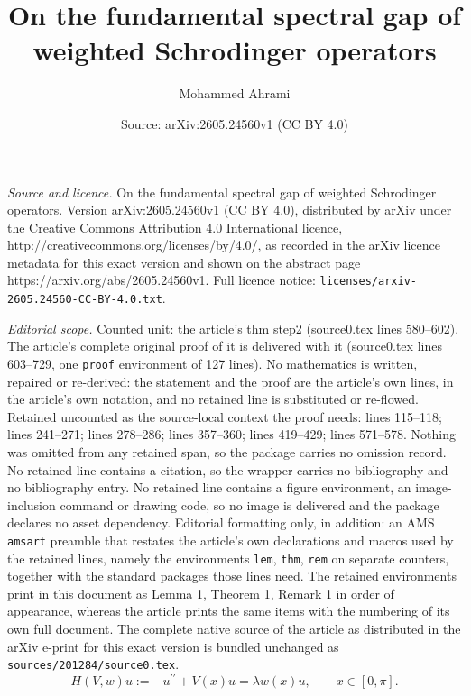 \documentclass[10pt,a4paper]{amsart}
\title{On the fundamental spectral gap of weighted Schrodinger operators}
\author{Mohammed Ahrami}
\date{Source: arXiv:2605.24560v1 (CC BY 4.0)}
\begin{document}
\maketitle

\noindent\emph{Source and licence.} On the fundamental spectral gap of weighted Schrodinger operators. Version arXiv:2605.24560v1 (CC BY 4.0), distributed by arXiv under the Creative Commons Attribution 4.0 International licence, http://creativecommons.org/licenses/by/4.0/, as recorded in the arXiv licence metadata for this exact version and shown on the abstract page https://arxiv.org/abs/2605.24560v1. Full licence notice: \texttt{licenses/arxiv-2605.24560-CC-BY-4.0.txt}.\par\smallskip

\noindent\textit{Editorial scope.} Counted unit: the article's thm step2 (source0.tex lines 580--602). The article's complete original proof of it is delivered with it (source0.tex lines 603--729, one \texttt{proof} environment of 127 lines). No mathematics is written, repaired or re-derived: the statement and the proof are the article's own lines, in the article's own notation, and no retained line is substituted or re-flowed.  Retained uncounted as the source-local context the proof needs: lines 115--118; lines 241--271; lines 278--286; lines 357--360; lines 419--429; lines 571--578.  Nothing was omitted from any retained span, so the package carries no omission record.  No retained line contains a citation, so the wrapper carries no bibliography and no bibliography entry.  No retained line contains a figure environment, an image-inclusion command or drawing code, so no image is delivered and the package declares no asset dependency.  Editorial formatting only, in addition: an AMS \texttt{amsart} preamble that restates the article's own declarations and macros used by the retained lines, namely the environments \texttt{lem}, \texttt{thm}, \texttt{rem} on separate counters, together with the standard packages those lines need.  The retained environments print in this document as Lemma 1, Theorem 1, Remark 1 in order of appearance, whereas the article prints the same items with the numbering of its own full document.  The complete native source of the article as distributed in the arXiv e-print for this exact version is bundled unchanged as \texttt{sources/201284/source0.tex}.
\begin{equation}\label{ePnoP}
H(V,w) u :=  -u^{\prime \prime} +V(x) u  = \lambda  w(x) u,
\quad\quad x\in [0,\pi].
\end{equation}
\end{document}
